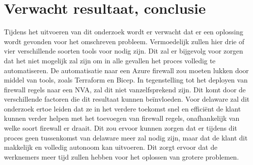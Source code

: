 \section{Verwacht resultaat, conclusie}%
\label{sec:verwachte_resultaten}

Tijdens het uitvoeren van dit onderzoek wordt er verwacht dat er een oplossing wordt gevonden voor het omschreven probleem. Vermoedelijk zullen hier drie of vier verschillende soorten tools voor nodig zijn. Dit zal er bijgevolg voor zorgen dat het niet mogelijk zal zijn om in alle gevallen het proces volledig te automatiseren. De automatisatie naar een Azure firewall zou moeten lukken door middel van tools, zoals Terraform en Bicep. In tegenstelling tot het deployen van firewall regels naar een NVA, zal dit niet vanzelfsprekend zijn. Dit komt door de verschillende factoren die dit resultaat kunnen beïnvloeden.  Voor delaware zal dit onderzoek ertoe leiden dat ze in het verdere toekomst snel en efficiënt de klant kunnen verder helpen met het toevoegen van firewall regels, onafhankelijk van welke soort firewall er draait. Dit zou ervoor kunnen zorgen dat er tijdens dit proces geen tussenkomst van delaware meer zal nodig zijn, maar dat de klant dit makkelijk en volledig autonoom kan uitvoeren. Dit zorgt ervoor dat de werknemers meer tijd zullen hebben voor het oplossen van grotere problemen. 